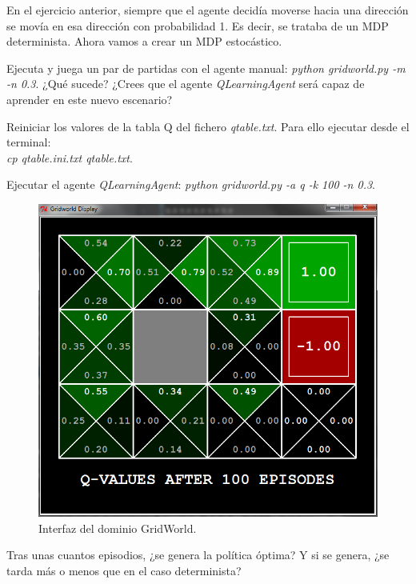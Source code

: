 \documentclass[11pt]{exam}
\begin{document}
En el ejercicio anterior, siempre que el agente decidía moverse hacia una dirección se movía en esa dirección con probabilidad 1. Es decir, se trataba de un MDP determinista. Ahora vamos a crear un MDP estocástico.

\begin{questions}

{ \question Ejecuta y juega un par de partidas con el agente manual: \textit{python gridworld.py -m -n 0.3}. ¿Qué sucede? ¿Crees que el agente \textit{QLearningAgent} será capaz de aprender en este nuevo escenario?
}

{ \question Reiniciar los valores de la tabla Q del fichero \textit{qtable.txt}. Para ello ejecutar desde el terminal: \\ \textit{cp qtable.ini.txt qtable.txt}.
}

{ \question Ejecutar el agente \textit{QLearningAgent}: \textit{python gridworld.py -a q -k 100 -n 0.3}.}

\begin{figure}[h]
	\centering
	\includegraphics[scale=0.5]{image_5}
	\caption{Interfaz del dominio GridWorld.}
	\label{image_5}
\end{figure}

{ \question Tras unas cuantos episodios, ¿se genera la política óptima? Y si se genera, ¿se tarda más o menos que en el caso determinista?
}

\end{questions}
\end{document}
